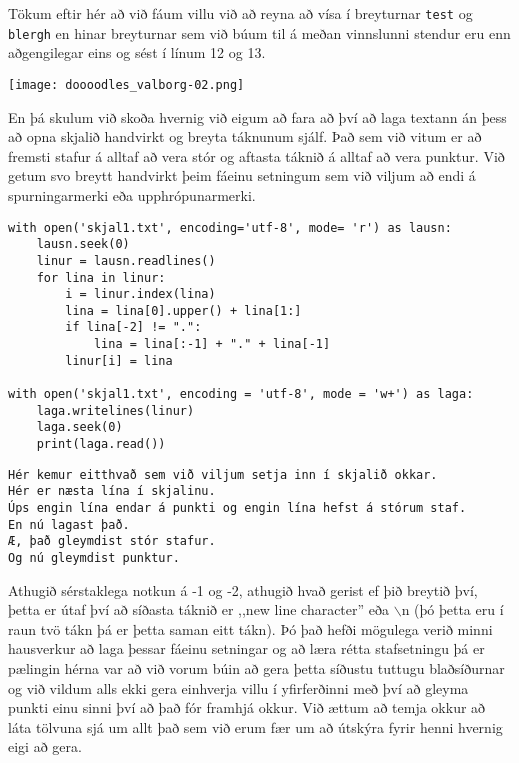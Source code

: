 Tökum eftir hér að við fáum villu við að reyna að vísa í breyturnar \texttt{test} og \texttt{blergh} en hinar breyturnar sem við búum til á meðan vinnslunni stendur eru enn aðgengilegar eins og sést í línum 12 og 13.
\phantom{easter egg}
\begin{center}
	\texttt{[image: doooodles\_valborg-02.png]}
\end{center}
En þá skulum við skoða hvernig við eigum að fara að því að laga textann án þess að opna skjalið handvirkt og breyta táknunum sjálf.
Það sem við vitum er að fremsti stafur á alltaf að vera stór og aftasta táknið á alltaf að vera punktur.
Við getum svo breytt handvirkt þeim fáeinu setningum sem við viljum að endi á spurningarmerki eða upphrópunarmerki.

\begin{lstlisting}[caption=Leysum punkta og hástafa vandann okkar, label=lst:skjalavinnsla-lausn]
with open('skjal1.txt', encoding='utf-8', mode= 'r') as lausn:
	lausn.seek(0)
	linur = lausn.readlines()
	for lina in linur:
		i = linur.index(lina)
		lina = lina[0].upper() + lina[1:]
		if lina[-2] != ".":
			lina = lina[:-1] + "." + lina[-1]
		linur[i] = lina

with open('skjal1.txt', encoding = 'utf-8', mode = 'w+') as laga:
	laga.writelines(linur)
	laga.seek(0)
	print(laga.read())
\end{lstlisting}
\lstset{style=uttak}
\begin{lstlisting}
Hér kemur eitthvað sem við viljum setja inn í skjalið okkar.
Hér er næsta lína í skjalinu.
Úps engin lína endar á punkti og engin lína hefst á stórum staf.
En nú lagast það.
Æ, það gleymdist stór stafur.
Og nú gleymdist punktur.
\end{lstlisting}
\lstset{style=venjulegt}

Athugið sérstaklega notkun á -1 og -2, athugið hvað gerist ef þið breytið því, þetta er útaf því að síðasta táknið er ,,new line character'' eða $\backslash$n (þó þetta eru í raun tvö tákn þá er þetta saman eitt tákn).
Þó það hefði mögulega verið minni hausverkur að laga þessar fáeinu setningar og að læra rétta stafsetningu þá er pælingin hérna var að við vorum búin að gera þetta síðustu tuttugu blaðsíðurnar og við vildum alls ekki gera einhverja villu í yfirferðinni með því að gleyma punkti einu sinni því að það fór framhjá okkur.
Við ættum að temja okkur að láta tölvuna sjá um allt það sem við erum fær um að útskýra fyrir henni hvernig eigi að gera.

